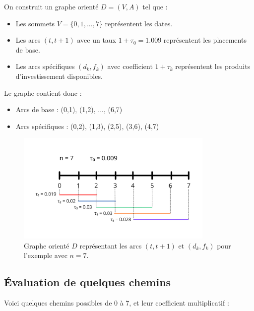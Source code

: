 \documentclass[a4paper,11pt]{article}
\begin{document}
    On construit un graphe orienté $D = (V, A)$ tel que :
    \begin{itemize}
        \item Les sommets $V = \{0, 1, ..., 7\}$ représentent les dates.
        \item Les arcs $(t, t+1)$ avec un taux $1 + \tau_0 = 1.009$ représentent les placements de base.
        \item Les arcs spécifiques $(d_k, f_k)$ avec coefficient $1 + \tau_k$ représentent les produits d’investissement disponibles.
    \end{itemize}

    Le graphe contient donc :
    \begin{itemize}
        \item Arcs de base : (0,1), (1,2), ..., (6,7)
        \item Arcs spécifiques : (0,2), (1,3), (2,5), (3,6), (4,7)
    \end{itemize}

    \begin{figure}[h!]
        \centering
        \includegraphics[width=0.85\textwidth]{images/graph_concret_exemple.png}
        \caption{Graphe orienté $D$ représentant les arcs $(t, t+1)$ et $(d_k, f_k)$ pour l'exemple avec $n = 7$.}
        \label{fig:graphe_exemple}
    \end{figure}

    \subsection{Évaluation de quelques chemins}

    Voici quelques chemins possibles de 0 à 7, et leur coefficient multiplicatif :
\end{document}
